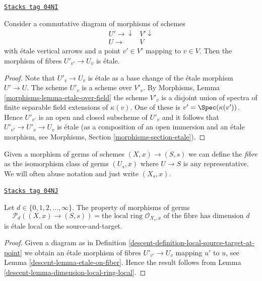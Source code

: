 \begin{lemma}
\label{descent-lemma-etale-on-fiber}
\href{https://stacks.math.columbia.edu/tag/04NI}{\texttt{Stacks tag 04NI}}

Consider a commutative diagram of morphisms of schemes
$$
\begin{array}{cc}U' \longrightarrow\downarrow & V' \downarrow \\ U \longrightarrow & V\end{array}
$$
with \'etale vertical arrows and a point $v' \in V'$ mapping to $v \in V$.
Then the morphism of fibres $U'_{v'} \to U_v$ is \'etale.
\end{lemma}

\begin{proof}
Note that $U'_v \to U_v$ is \'etale as a base change of the \'etale
morphism $U' \to U$. The scheme $U'_v$ is a scheme over $V'_v$. By
Morphisms, Lemma \ref{morphisms-lemma-etale-over-field}
the scheme $V'_v$ is a disjoint union of spectra
of finite separable field extensions of $\kappa(v)$.
One of these is $v' = \Spec(\kappa(v'))$. Hence
$U'_{v'}$ is an open and closed subscheme of $U'_v$ and it follows
that $U'_{v'} \to U'_v \to U_v$ is \'etale (as a composition of an
open immersion and an \'etale morphism, see
Morphisms, Section \ref{morphisms-section-etale}).
\end{proof}

Given a morphism of germs of schemes $(X, x) \to (S, s)$
we can define the {\it fibre} as the isomorphism class of germs
$(U_s, x)$ where $U \to S$ is any representative. We will often abuse notation
and just write $(X_s, x)$.

\begin{lemma}
\label{descent-lemma-dimension-local-ring-fibre}
\href{https://stacks.math.columbia.edu/tag/04NJ}{\texttt{Stacks tag 04NJ}}

Let $d \in \{0, 1, 2, \ldots, \infty\}$.
The property of morphisms of germs
$$
\mathcal{P}_d((X, x) \to (S, s)) =
\text{the local ring }
\mathcal{O}_{X_s, x}
\text{ of the fibre has dimension }d
$$
is \'etale local on the source-and-target.
\end{lemma}

\begin{proof}

Given a diagram as in
Definition \ref{descent-definition-local-source-target-at-point}
we obtain an \'etale morphism of fibres
$U'_{v'} \to U_v$ mapping $u'$ to $u$, see
Lemma \ref{descent-lemma-etale-on-fiber}.
Hence the result follows from
Lemma \ref{descent-lemma-dimension-local-ring-local}.
\end{proof}

